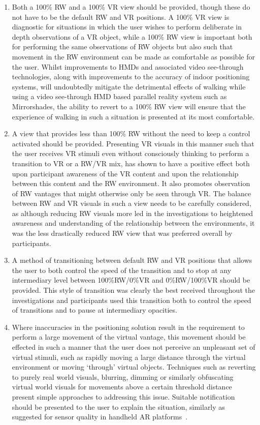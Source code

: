 \begin{enumerate}
	\item Both a 100\% RW and a 100\% VR view should be provided, though these do not have to be the default RW and VR positions. A 100\% VR view is diagnostic for situations in which the user wishes to perform deliberate in depth observations of a VR object, while a 100\% RW view is important both for performing the same observations of RW objects but also such that movement in the RW environment can be made as comfortable as possible for the user. Whilst improvements to HMDs and associated video see-through technologies, along with improvements to the accuracy of indoor positioning systems, will undoubtedly mitigate the detrimental effects of walking while using a video see-through HMD based parallel reality system such as Mirrorshades, the ability to revert to a 100\% RW view will ensure that the experience of walking in such a situation is presented at its most comfortable.
	\item A view that provides less than 100\% RW without the need to keep a control activated should be provided. Presenting VR visuals in this manner such that the user receives VR stimuli even without consciously thinking to perform a transition to VR or a RW/VR mix, has shown to have a positive effect both upon participant awareness of the VR content and upon the relationship between this content and the RW environment. It also promotes observation of RW vantages that might otherwise only be seen through VR. The balance between RW and VR visuals in such a view needs to be carefully considered, as although reducing RW visuals more led in the investigations to heightened awareness and understanding of the relationship between the environments, it was the less drastically reduced RW view that was preferred overall by participants.
	\item A method of transitioning between default RW and VR positions that allows the user to both control the speed of the transition and to stop at any intermediary level between 100\%RW/0\%VR and 0\%RW/100\%VR should be provided. This style of transition was clearly the best received throughout the investigations and participants used this transition both to control the speed of transitions and to pause at intermediary opacities.
	\item Where inaccuracies in the positioning solution result in the requirement to perform a large movement of the virtual vantage, this movement should be effected in such a manner that the user does not perceive an unpleasant set of virtual stimuli, such as rapidly moving a large distance through the virtual environment or moving `through' virtual objects. Techniques such as reverting to purely real world visuals, blurring, dimming or similarly obfuscating virtual world visuals for movements above a certain threshold distance present simple approaches to addressing this issue. Suitable notification should be presented to the user to explain the situation, similarly as suggested for sensor quality in handheld AR platforms~\cite{Billinghurst2014}.
\end{enumerate}


